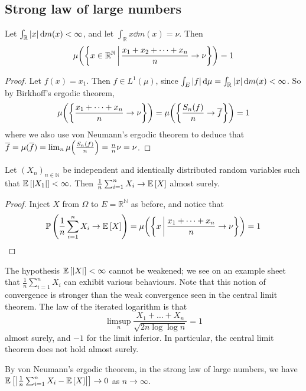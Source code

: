 \subsection{Strong law of large numbers}
\begin{theorem}
	Let \( \int_{\mathbb R} \abs{x} \dd{m(x)} < \infty \), and let \( \int_{\mathbb R} x \dd{m(x)} = \nu \).
	Then
	\[ \mu\qty(\qty{x \in \mathbb R^{\mathbb N} \,\middle|\,\frac{x_1 + x_2 + \dots + x_n}{n} \to \nu}) = 1 \]
\end{theorem}
\begin{proof}
	Let \( f(x) = x_1 \).
	Then \( f \in L^1(\mu) \), since \( \int_E \abs{f} \dd{\mu} = \int_{\mathbb R} \abs{x} \dd{m(x)} < \infty \).
	So by Birkhoff's ergodic theorem,
	\[ \mu\qty(\qty{ \frac{x_1 + \dots + x_n}{n} \to \nu }) = \mu\qty(\qty{ \frac{S_n(f)}{n} \to \overline f }) = 1 \]
	where we also use von Neumann's ergodic theorem to deduce that \( \overline f = \mu(\overline f) = \lim_n \mu\qty(\frac{S_n(f)}{n}) = \frac{n}{n} \nu = \nu \).
\end{proof}
\begin{theorem}
	Let \( (X_n)_{n \in \mathbb N} \) be independent and identically distributed random variables such that \( \mathbb{E}\left[{\abs{X_1}}\right] < \infty \).
	Then \( \frac{1}{n} \sum_{i=1}^n X_i \to \mathbb{E}\left[{X}\right] \) almost surely.
\end{theorem}
\begin{proof}
	Inject \( X \) from \( \Omega \) to \( E = \mathbb R^{\mathbb N} \) as before, and notice that
	\[ \mathbb{P}\left({\frac{1}{n} \sum_{i=1}^n X_i \to \mathbb{E}\left[{X}\right]}\right) = \mu\qty(\qty{ x \,\middle|\,\frac{x_1 + \dots + x_n}{n} \to \nu }) = 1 \]
\end{proof}
\begin{remark}
	The hypothesis \( \mathbb{E}\left[{\abs{X}}\right] < \infty \) cannot be weakened; we see on an example sheet that \( \frac{1}{n} \sum_{i=1}^n X_i \) can exhibit various behaviours.
	Note that this notion of convergence is stronger than the weak convergence seen in the central limit theorem.
	The law of the iterated logarithm is that
	\[ \limsup_n \frac{X_1 + \dots + X_n}{\sqrt{2 n \log \log n}} = 1 \]
	almost surely, and \( -1 \) for the limit inferior.
	In particular, the central limit theorem does not hold almost surely.
\end{remark}
\begin{corollary}
	By von Neumann's ergodic theorem, in the strong law of large numbers, we have \( \mathbb{E}\left[{\abs{\frac{1}{n} \sum_{i=1}^n X_i - \mathbb{E}\left[{X}\right]}}\right] \to 0 \) as \( n \to \infty \).
\end{corollary}
